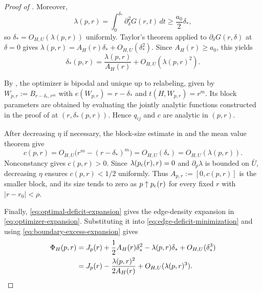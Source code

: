 \begin{proof}[Proof of ]
Moreover,
\[
  \lambda(p,r)
  =\int_0^{\delta_*}\partial_\delta^2G(r,t)\,dt
  \ge\frac{a_0}{2}\delta_*,
\]
so $\delta_*=O_{H,U}(\lambda(p,r))$ uniformly.
Taylor's theorem applied to $\partial_\delta G(r,\delta)$ at $\delta=0$
gives $\lambda(p,r)=A_H(r)\delta_*+O_{H,U}(\delta_*^2)$.
Since $A_H(r)\ge a_0$, this yields
\begin{equation}\label{eq:optimal-deficit-expansion}
  \delta_*(p,r)
  =\frac{\lambda(p,r)}{A_H(r)}+O_{H,U}(\lambda(p,r)^2).
\end{equation}

By , the optimizer is bipodal and unique up to relabeling,
given by $W_{p,r}:=B_{r-\delta_*,r^m}$ with $e(W_{p,r})=r-\delta_*$ and
$t(H,W_{p,r})=r^m$.
Its block parameters are obtained by evaluating the jointly analytic
functions constructed in the proof of 
at $(r,\delta_*(p,r))$.  Hence $q_{ij}$ and $c$ are analytic in $(p,r)$.

After decreasing $\eta$ if necessary, the block-size estimate in
 and the mean value theorem give
\[
  c(p,r)=O_{H,U}\bigl(r^m-(r-\delta_*)^m\bigr)
  =O_{H,U}(\delta_*)=O_{H,U}(\lambda(p,r)).
\]
Nonconstancy gives $c(p,r)>0$.  Since $\lambda(p_{\mathrm c}(r),r)=0$ and
$\partial_p\lambda$ is bounded on $\bar U$, decreasing $\eta$ ensures
$c(p,r)<1/2$ uniformly.  Thus $A_{p,r}:=[0,c(p,r)]$ is the smaller block,
and its size tends to zero as $p\uparrow p_{\mathrm c}(r)$ for every fixed $r$ with
$|r-r_0|<\rho$.

Finally, \eqref{eq:optimal-deficit-expansion} gives the edge-density
expansion in \eqref{eq:optimizer-expansion}.  Substituting it into
\eqref{eq:edge-deficit-minimization} and using
\eqref{eq:boundary-excess-expansion} gives
\begin{align*}
  \Phi_H(p,r)
  &=J_p(r)+\frac12A_H(r)\delta_*^2-\lambda(p,r)\delta_*
    +O_{H,U}(\delta_*^3)\\
  &=J_p(r)-\frac{\lambda(p,r)^2}{2A_H(r)}
    +O_{H,U}(\lambda(p,r)^3).
    \qedhere
\end{align*}
\end{proof}
